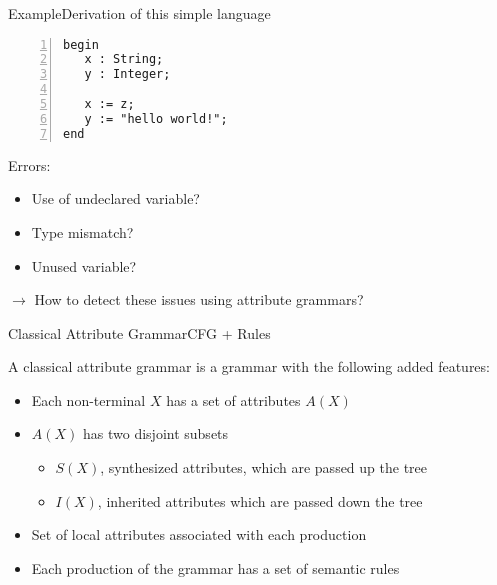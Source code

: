 

\begin{frame}[fragile=singleslide]{Example}{Derivation of this simple language}

\begin{Verbatim}[fontsize=\scriptsize,numbers=left,xleftmargin=5mm]
begin
   x : String;
   y : Integer;
	
   x := z;
   y := "hello world!";
end
\end{Verbatim}

Errors:
\begin{itemize}
    \item Use of undeclared variable?
    \item Type mismatch?
    \item Unused variable?
\end{itemize}

\newlinevspace

$\to$ How to detect these issues using attribute grammars?
\end{frame}




\begin{frame}{Classical Attribute Grammar}{CFG + Rules}


A classical attribute grammar is a \alert{grammar} with the following added features:

\begin{itemize}
    \item Each non-terminal $X$ has a set of attributes $A(X)$
    \item $A(X)$ has two disjoint subsets
    \begin{itemize}
        \item $S(X)$, synthesized attributes, which are passed up the tree
        \item $I(X)$, inherited attributes which are passed down the tree
    \end{itemize}
    \item Set of local attributes associated with each production
    \item Each production of the grammar has a set of semantic rules
\end{itemize}

\end{frame}

